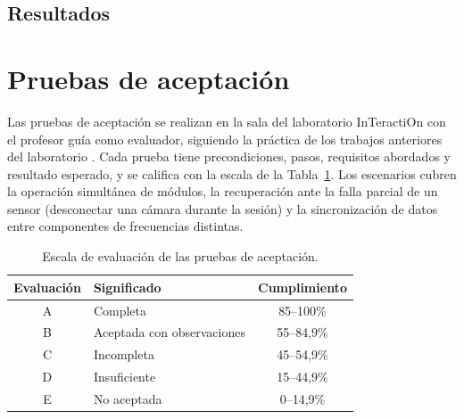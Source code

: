 \subsection{Resultados}


\section{Pruebas de aceptación}

Las pruebas de aceptación se realizan en la sala del laboratorio InTeractiOn con el profesor guía como evaluador, siguiendo la práctica de los trabajos anteriores del laboratorio \citep{estay2020,pezoa2020,figueroa2025}. Cada prueba tiene precondiciones, pasos, requisitos abordados y resultado esperado, y se califica con la escala de la Tabla~\ref{tab:escala}. Los escenarios cubren la operación simultánea de módulos, la recuperación ante la falla parcial de un sensor (desconectar una cámara durante la sesión) y la sincronización de datos entre componentes de frecuencias distintas.

\begin{table}[H]
\centering
\caption{Escala de evaluación de las pruebas de aceptación.}
\label{tab:escala}
\small
\begin{tabular}{clc}
\toprule
\textbf{Evaluación} & \textbf{Significado} & \textbf{Cumplimiento} \\ \midrule
A & Completa & 85--100\% \\
B & Aceptada con observaciones & 55--84,9\% \\
C & Incompleta & 45--54,9\% \\
D & Insuficiente & 15--44,9\% \\
E & No aceptada & 0--14,9\% \\ \bottomrule
\end{tabular}
\end{table}

